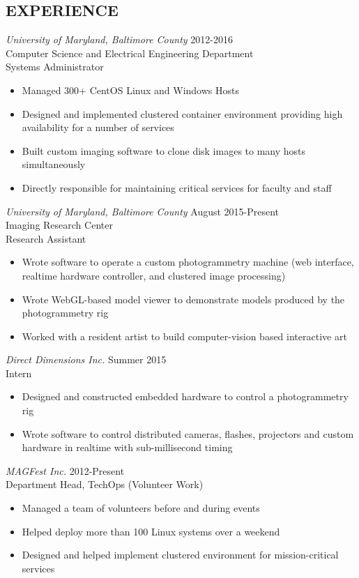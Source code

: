 \documentclass[line,0.5]{resume}
\begin{document}
\begin{resume}
\section{EXPERIENCE}
  {\sl University of Maryland, Baltimore County} \hfill 2012-2016 \\
    Computer Science and Electrical Engineering Department \\
    Systems Administrator
    \begin{itemize}
      \item Managed 300+ CentOS Linux and Windows Hosts
      \item Designed and implemented clustered container environment providing high availability for a number of services
      \item Built custom imaging software to clone disk images to many hosts simultaneously
      \item Directly responsible for maintaining critical services for faculty and staff
      \end{itemize}
  {\sl University of Maryland, Baltimore County} \hfill August 2015-Present \\
    Imaging Research Center \\
    Research Assistant
    \begin{itemize}
      \item Wrote software to operate a custom photogrammetry machine (web interface, realtime hardware controller, and clustered image processing)
      \item Wrote WebGL-based model viewer to demonstrate models produced by the photogrammetry rig
      \item Worked with a resident artist to build computer-vision based interactive art
    \end{itemize}
  {\sl Direct Dimensions Inc.} \hfill Summer 2015 \\
    Intern
    \begin{itemize}
      \item Designed and constructed embedded hardware to control a photogrammetry rig
      \item Wrote software to control distributed cameras, flashes, projectors and custom hardware in realtime with sub-millisecond timing
    \end{itemize}
  {\sl MAGFest Inc.} \hfill 2012-Present \\
    Department Head, TechOps (Volunteer Work)
    \begin{itemize}
      \item Managed a team of volunteers before and during events
      \item Helped deploy more than 100 Linux systems over a weekend
      \item Designed and helped implement clustered environment for mission-critical services
    \end{itemize}
\end{resume}
\end{document}

